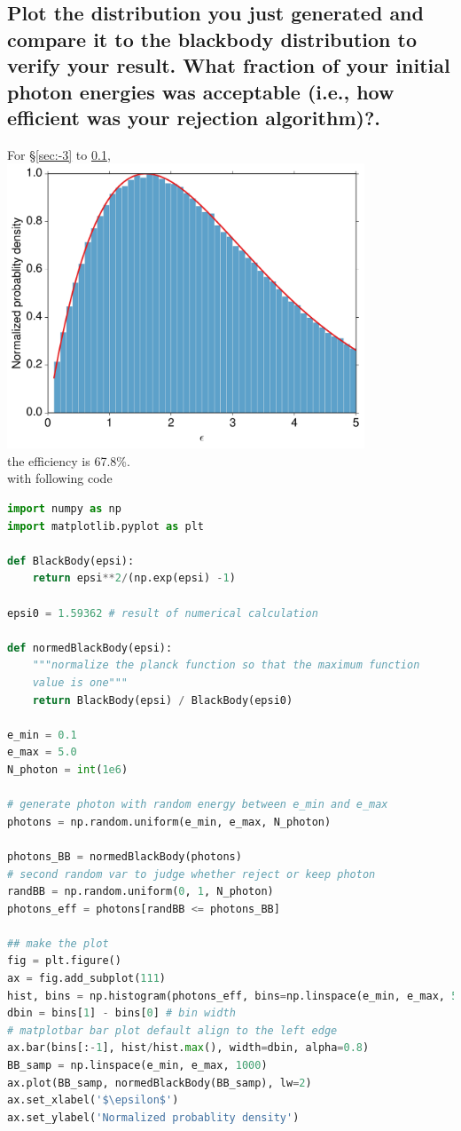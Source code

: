 \documentclass[paper=letter, fontsize=11pt]{scrartcl} %
\numberwithin{equation}{section} %
\numberwithin{figure}{section} %
\numberwithin{table}{section} %
\begin{document}
  \subsection{Plot the distribution you just generated and compare it
    to the blackbody distribution to verify your result. What fraction
    of your initial photon energies was acceptable (i.e., how
    efficient was your rejection algorithm)?.}\label{sec:-1}
  For \S\ref{sec:-3} to \ref{sec:-1}, 
  {\centering\includegraphics[width=0.8\textwidth]{bbdist.pdf}}\\
the efficiency is 67.8\%.\\
  with following code
\begin{lstlisting}[language=Python]
import numpy as np
import matplotlib.pyplot as plt

def BlackBody(epsi):
    return epsi**2/(np.exp(epsi) -1)

epsi0 = 1.59362 # result of numerical calculation

def normedBlackBody(epsi):
    """normalize the planck function so that the maximum function
    value is one"""
    return BlackBody(epsi) / BlackBody(epsi0)

e_min = 0.1
e_max = 5.0
N_photon = int(1e6)

# generate photon with random energy between e_min and e_max
photons = np.random.uniform(e_min, e_max, N_photon)

photons_BB = normedBlackBody(photons)
# second random var to judge whether reject or keep photon
randBB = np.random.uniform(0, 1, N_photon) 
photons_eff = photons[randBB <= photons_BB]

## make the plot
fig = plt.figure()
ax = fig.add_subplot(111)
hist, bins = np.histogram(photons_eff, bins=np.linspace(e_min, e_max, 50))
dbin = bins[1] - bins[0] # bin width
# matplotbar bar plot default align to the left edge
ax.bar(bins[:-1], hist/hist.max(), width=dbin, alpha=0.8)
BB_samp = np.linspace(e_min, e_max, 1000)
ax.plot(BB_samp, normedBlackBody(BB_samp), lw=2)
ax.set_xlabel('$\epsilon$')
ax.set_ylabel('Normalized probablity density') 
\end{lstlisting}
  

  
\end{document}
